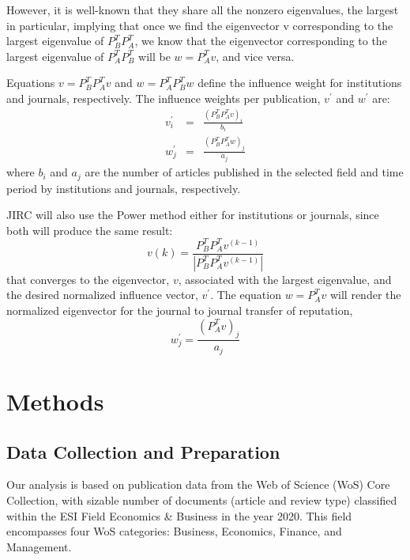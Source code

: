 \documentclass[10pt]{article}
\begin{document}
 However, it is well-known that they share all the nonzero eigenvalues, the largest in particular, implying that once we find the eigenvector v corresponding to the largest eigenvalue of $P_B^TP_A^T$, we know that the eigenvector corresponding to the largest eigenvalue of $P_A^TP_B^T$ will be $w=P_A^Tv$, and vice versa.

Equations $v=P_B^TP_A^Tv$ and $w=P_A^TP_B^Tw$ define the influence weight for institutions and journals, respectively. The influence weights per
publication, $v^{\prime}$ and $w^{\prime}$ are:
\begin{eqnarray*}
v^{\prime}_i &=& \frac{(P_B^TP_A^Tv)_i}{b_{i}} \\
w^{\prime}_j &=& \frac{(P_B^TP_A^Tw)_j}{a_{j}}
\end{eqnarray*}
where $b_i$ and $a_j$ are the number of articles published  in the selected field and time period by institutions and journals, respectively.


\noindent JIRC will also  use the Power method either for institutions or journals, since both will produce the same result:
\begin{equation}
v(k)=\frac{P_B^TP_A^Tv^{(k-1)}}{|P_B^TP_A^Tv^{(k-1)}|}
\label{pm}
\end{equation}
that converges to the eigenvector, $v$, associated with the largest eigenvalue,  and the desired normalized influence vector, $v^{\prime}$. The equation $w=P_A^Tv$ will render the normalized eigenvector for the journal to journal transfer of reputation,
\begin{equation}
w^{\prime}_j =
\frac{(P_A^Tv)_j}{a_{j}}
\end{equation}
\section{Methods}

\subsection{Data Collection and Preparation}
Our analysis is based on publication data from the Web of Science (WoS) Core Collection,  with sizable number of documents  (article and review type) classified within the ESI Field Economics \& Business in the year 2020. This field encompasses four WoS categories: Business, Economics, Finance, and Management.
\end{document}
